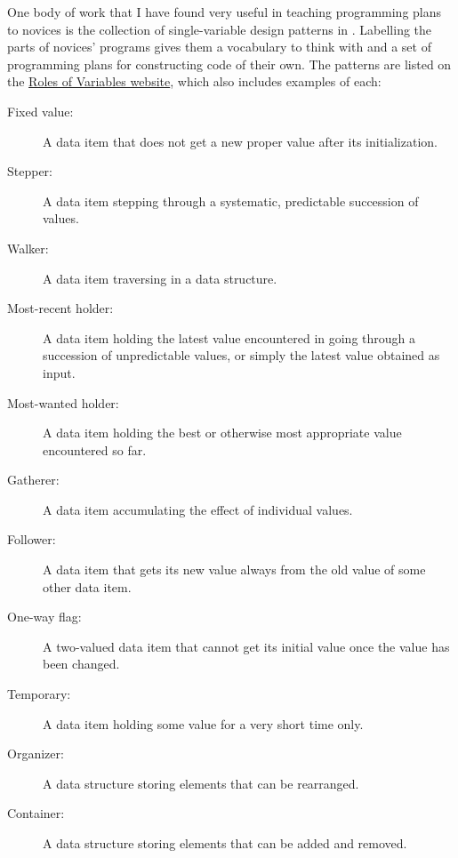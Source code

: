 One body of work that I have found very useful in teaching programming
plans to novices is the collection of single-variable design patterns
in \cite{Kuit2004,Byck2005,Saja2006}.  Labelling the parts of novices'
programs gives them a vocabulary to think with and a set of
programming plans for constructing code of their own.  The patterns
are listed on the \href{http://saja.kapsi.fi/var\_roles/}{Roles of
  Variables website}, which also includes examples of each:

\begin{description}

\item[Fixed value:] A data item that does not get a new proper value
  after its initialization.

\item[Stepper:] A data item stepping through a systematic, predictable
  succession of values.

\item[Walker:] A data item traversing in a data structure.

\item[Most-recent holder:] A data item holding the latest value
  encountered in going through a succession of unpredictable values,
  or simply the latest value obtained as input.

\item[Most-wanted holder:] A data item holding the best or otherwise
  most appropriate value encountered so far.

\item[Gatherer:] A data item accumulating the effect of individual
  values.

\item[Follower:] A data item that gets its new value always from the
  old value of some other data item.

\item[One-way flag:] A two-valued data item that cannot get its
  initial value once the value has been changed.

\item[Temporary:] A data item holding some value for a very short time
  only.

\item[Organizer:] A data structure storing elements that can be
  rearranged.

\item[Container:] A data structure storing elements that can be added
  and removed.

\end{description}

